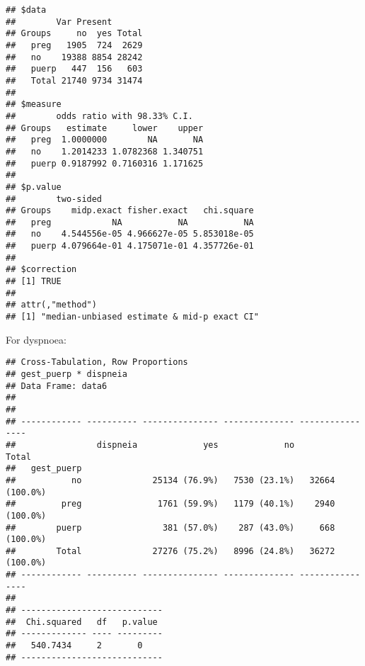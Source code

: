 \documentclass[
]{article}
\newenvironment{Shaded}{\begin{snugshade}}{\end{snugshade}}
\newcommand{\DataTypeTok}[1]{\textcolor[rgb]{0.13,0.29,0.53}{#1}}
\newcommand{\KeywordTok}[1]{\textcolor[rgb]{0.13,0.29,0.53}{\textbf{#1}}}
\newcommand{\NormalTok}[1]{#1}
\newcommand{\OperatorTok}[1]{\textcolor[rgb]{0.81,0.36,0.00}{\textbf{#1}}}
\newcommand{\OtherTok}[1]{\textcolor[rgb]{0.56,0.35,0.01}{#1}}
\newcommand{\StringTok}[1]{\textcolor[rgb]{0.31,0.60,0.02}{#1}}
\begin{document}
\begin{verbatim}
## $data
##        Var Present
## Groups     no  yes Total
##   preg   1905  724  2629
##   no    19388 8854 28242
##   puerp   447  156   603
##   Total 21740 9734 31474
## 
## $measure
##        odds ratio with 98.33% C.I.
## Groups   estimate     lower    upper
##   preg  1.0000000        NA       NA
##   no    1.2014233 1.0782368 1.340751
##   puerp 0.9187992 0.7160316 1.171625
## 
## $p.value
##        two-sided
## Groups    midp.exact fisher.exact   chi.square
##   preg            NA           NA           NA
##   no    4.544556e-05 4.966627e-05 5.853018e-05
##   puerp 4.079664e-01 4.175071e-01 4.357726e-01
## 
## $correction
## [1] TRUE
## 
## attr(,"method")
## [1] "median-unbiased estimate & mid-p exact CI"
\end{verbatim}

For dyspnoea:

\begin{Shaded}
\end{Shaded}

\begin{verbatim}
## Cross-Tabulation, Row Proportions  
## gest_puerp * dispneia  
## Data Frame: data6  
## 
## 
## ------------ ---------- --------------- -------------- ----------------
##                dispneia             yes             no            Total
##   gest_puerp                                                           
##           no              25134 (76.9%)   7530 (23.1%)   32664 (100.0%)
##         preg               1761 (59.9%)   1179 (40.1%)    2940 (100.0%)
##        puerp                381 (57.0%)    287 (43.0%)     668 (100.0%)
##        Total              27276 (75.2%)   8996 (24.8%)   36272 (100.0%)
## ------------ ---------- --------------- -------------- ----------------
## 
## ----------------------------
##  Chi.squared   df   p.value 
## ------------- ---- ---------
##   540.7434     2       0    
## ----------------------------
\end{verbatim}

\begin{Shaded}
\end{Shaded}
\end{document}
